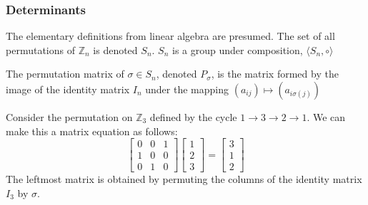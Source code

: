 \documentclass[crop=false,class=book,oneside]{standalone}
\begin{document}
            \subsubsection{Determinants}
                The elementary definitions from linear algebra
                are presumed. The set of all permutations of
                $\mathbb{Z}_{n}$ is denoted $S_n$. $S_{n}$ is a
                group under composition,
                $\langle S_{n},\circ\rangle$
                \begin{definition}
                    The permutation matrix of $\sigma \in S_{n}$,
                    denoted $P_{\sigma}$, is the matrix formed
                    by the image of the identity matrix $I_{n}$
                    under the mapping
                    $(a_{ij})\mapsto (a_{i\sigma(j)})$
                \end{definition}
                \begin{example}
                    Consider the permutation on $\mathbb{Z}_3$
                    defined by the cycle
                    $1\rightarrow 3\rightarrow 2\rightarrow 1$.
                    We can make this a matrix equation as follows:
                    \begin{equation*}
                        \begin{bmatrix}
                            0&0&1\\
                            1&0&0\\
                            0&1&0
                        \end{bmatrix}
                        \begin{bmatrix}
                            1\\
                            2\\
                            3
                        \end{bmatrix}
                        =
                        \begin{bmatrix}
                            3\\
                            1\\
                            2
                        \end{bmatrix}    
                    \end{equation*}
                    The leftmost matrix is obtained by
                    permuting the columns of the identity
                    matrix $I_{3}$ by $\sigma$.
                \end{example}
\end{document}
